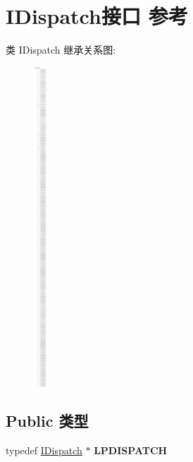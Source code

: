 \hypertarget{interface_i_dispatch}{}\section{I\+Dispatch接口 参考}
\label{interface_i_dispatch}
类 I\+Dispatch 继承关系图\+:\begin{figure}[H]
\begin{center}
\leavevmode
\includegraphics[height=12.000000cm]{interface_i_dispatch}
\end{center}
\end{figure}
\subsection*{Public 类型}
\begin{DoxyCompactItemize}
\item 
\mbox{\label{interface_i_dispatch_ab3abeeca7f6e10e1dced470ea16f268c}} 
typedef \hyperlink{interface_i_dispatch}{I\+Dispatch} $\ast$ {\bfseries L\+P\+D\+I\+S\+P\+A\+T\+CH}
\end{DoxyCompactItemize}
